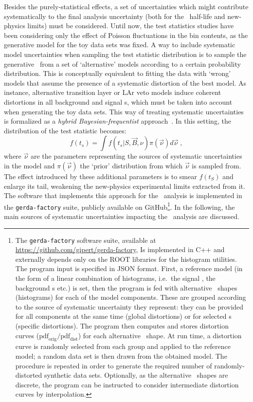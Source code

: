 Besides the purely-statistical effects, a set of uncertainties which might contribute
systematically to the final analysis uncertainty (both for the \nnbb\ half-life and
new-physics limits) must be considered. Until now, the test statistics studies have been
considering only the effect of Poisson fluctuations in the bin contents, as the generative
model for the toy data sets was fixed. A way to include systematic model uncertainties
when sampling the test statistic distribution is to sample the generative \pdf\ from a set
of `alternative' models according to a certain probability distribution. This is
conceptually equivalent to fitting the data with `wrong' models that assume the presence
of a systematic distortion of the best model. As instance, alternative transition layer
or LAr veto models induce coherent distortions in all background and signal \pdf{}s, which
must be taken into account when generating the toy data sets.
\newpar
This way of treating systematic uncertainties is formalized as a \emph{hybrid
Bayesian-frequentist} approach~\cite{Zyla2020}. In this setting, the distribution
of the test statistic becomes:
\[
  f(t_s) = \int f(t_s | S, \vec{B}, \nu) \pi(\vec{\nu}) d\vec{\nu} \;,
\]
where $\vec{\nu}$ are the parameters representing the sources of systematic uncertainties
in the model and $\pi(\vec{\nu})$ the `prior' distribution from which $\vec{\nu}$ is sampled
from. The effect introduced by these additional parameters is to smear $f(t_S)$ and
enlarge its tail, weakening the new-physics experimental limits extracted from it. The
software that implements this approach for the \nnbb\ analysis is implemented in the
\texttt{gerda-factory} suite, publicly available on GitHub\footnote{%
  The \texttt{gerda-factory} software suite, available at
  \url{https://github.com/gipert/gerda-factory}, Is implemented in C++ and externally
  depends only on the ROOT libraries for the histogram utilities. The program input is
  specified in JSON format. First, a reference model (in the form of a linear combination
  of histograms, i.e.~the signal \pdf, the background \pdf{}s etc.) is set, then the program
  is fed with alternative \pdf\ shapes (histograms) for each of the model components. These
  are grouped according to the source of systematic uncertainty they represent: they can
  be provided for all components at the same time (global distortions) or for selected
  \pdf{}s (specific distortions). The program then computes and stores distortion curves
  ($\text{pdf}_\text{orig}/\text{pdf}_\text{dist}$) for each alternative \pdf\ shape. At run
  time, a distortion curve is randomly selected from each group and applied to the
  reference model; a random data set is then drawn from the obtained model. The procedure
  is repeated in order to generate the required number of randomly-distorted synthetic
  data sets. Optionally, as the alternative \pdf\ shapes are discrete, the program can be
  instructed to consider intermediate distortion curves by interpolation.
}. In the following, the main sources of systematic uncertainties impacting the \nnbb\
analysis are discussed.

